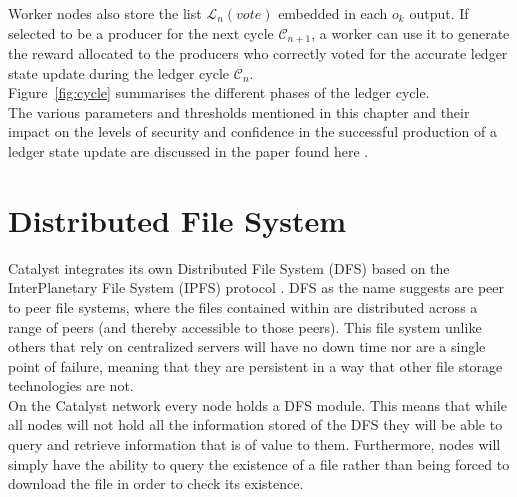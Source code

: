 \documentclass{article}
\begin{document}
Worker nodes also store the list $\mathcal{L}_{n}(vote)$ embedded in each $o_k$ output. If selected to be a producer for the next cycle $\mathcal{C}_{n+1}$, a worker can use it to generate the reward allocated to the producers who correctly voted for the accurate ledger state update during the ledger cycle $\mathcal{C}_{n}$.\\

Figure~\ref{fig:cycle} summarises the different phases of the ledger cycle.\\

The various parameters and thresholds mentioned in this chapter and their impact on the levels of security and confidence in the successful production of a ledger state update are discussed in the paper found here \cite{catalystresearch2}.

\section{Distributed File System}

Catalyst integrates its own Distributed File System (DFS) \cite{DFS} based on the InterPlanetary File System (IPFS) protocol \cite{benet2014ipfs}. DFS as the name suggests are peer to peer file systems, where the files contained within are distributed across a range of peers (and thereby accessible to those peers). This file system unlike others that rely on centralized servers will have no down time nor are a single point of failure, meaning that they are persistent in a way that other file storage technologies are not. \\



On the Catalyst network every node holds a DFS module. This means that while all nodes will not hold all the information stored of the DFS they will be able to query and retrieve information that is of value to them. Furthermore, nodes will simply have the ability to query the existence of a file rather than being forced to download the file in order to check
its existence. \\                                                                                                                                                                                                                                                                                                                                                                                                                                                                                                                                                                                                                                                                                                                                                                                                                                                                                                                                                                                                                                                                                                                                                       
\end{document}
